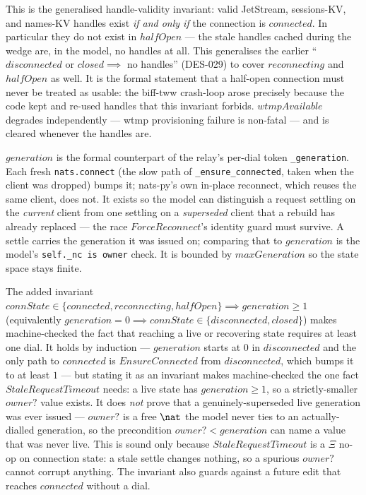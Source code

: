 \documentclass[a4paper,10pt,fleqn]{article}
\begin{document}
This is the generalised handle-validity invariant: valid
JetStream, sessions-KV, and names-KV handles exist \emph{if and
only if} the connection is $connected$.  In particular they do
not exist in $halfOpen$ --- the stale handles cached during the
wedge are, in the model, no handles at all.  This generalises the
earlier ``$disconnected$ or $closed \implies$ no handles'' (DES-029)
to cover $reconnecting$ and $halfOpen$ as well.  It is the
formal statement that a half-open connection must never be treated
as usable: the biff-tww crash-loop arose precisely because the code
kept and re-used handles that this invariant forbids.
$wtmpAvailable$ degrades independently --- wtmp provisioning
failure is non-fatal --- and is cleared whenever the handles are.

$generation$ is the formal counterpart of the relay's per-dial
token \texttt{\_generation}.  Each fresh \texttt{nats.connect}
(the slow path of \texttt{\_ensure\_connected}, taken when the
client was dropped) bumps it; nats-py's own in-place reconnect,
which reuses the same client, does not.  It exists so the model
can distinguish a request settling on the \emph{current} client
from one settling on a \emph{superseded} client that a rebuild has
already replaced --- the race $ForceReconnect$'s identity guard
must survive.  A settle carries the generation it was issued on;
comparing that to $generation$ is the model's \texttt{self.\_nc is
owner} check.  It is bounded by $maxGeneration$ so the state space
stays finite.

The added invariant $connState \in \{ connected, reconnecting,
halfOpen \} \implies generation \geq 1$ (equivalently $generation =
0 \implies connState \in \{ disconnected, closed \}$) makes
machine-checked the fact that reaching a live or recovering state
requires at least one dial.  It holds by induction --- $generation$
starts at $0$ in $disconnected$ and the only path to $connected$ is
$EnsureConnected$ from $disconnected$, which bumps it to at least
$1$ --- but stating it as an invariant makes machine-checked the one
fact $StaleRequestTimeout$ needs: a live state has $generation \geq 1$,
so a strictly-smaller $owner?$ value exists.  It does \emph{not} prove
that a genuinely-superseded live generation was ever issued --- $owner?$
is a free $\nat$ the model never ties to an actually-dialled generation,
so the precondition $owner? < generation$ can name a value that was never
live.  This is sound only because $StaleRequestTimeout$ is a $\Xi$ no-op
on connection state: a stale settle changes nothing, so a spurious
$owner?$ cannot corrupt anything.  The invariant also guards against a
future edit that reaches $connected$ without a dial.
\end{document}
